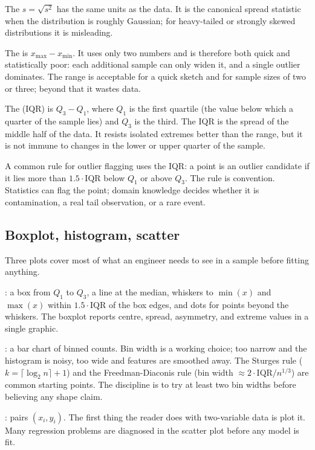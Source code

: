 The  $s = \sqrt{s^{2}}$ has the
same units as the data. It is the canonical spread statistic when the
distribution is roughly Gaussian; for heavy-tailed or strongly
skewed distributions it is misleading.

The  is $x_{\max} - x_{\min}$. It uses only two
numbers and is therefore both quick and statistically poor: each
additional sample can only widen it, and a single outlier dominates.
The range is acceptable for a quick sketch and for sample sizes of
two or three; beyond that it wastes data.

The  (IQR) is $Q_{3} - Q_{1}$, where
$Q_{1}$ is the first quartile (the value below which a quarter of
the sample lies) and $Q_{3}$ is the third. The IQR is the spread of
the middle half of the data. It resists isolated extremes better
than the range, but it is not immune to changes in the lower or
upper quarter of the sample.

A common rule for outlier flagging uses the IQR: a point is an
outlier candidate if it lies more than $1.5 \cdot \text{IQR}$ below
$Q_{1}$ or above $Q_{3}$. The rule is convention. Statistics can
flag the point; domain knowledge decides whether it is
contamination, a real tail observation, or a rare event.

\subsection{Boxplot, histogram, scatter}

Three plots cover most of what an engineer needs to see in a sample
before fitting anything.

: a box from $Q_{1}$ to $Q_{3}$, a line at the
median, whiskers to $\min(x)$ and $\max(x)$ within $1.5 \cdot
\text{IQR}$ of the box edges, and dots for points beyond the
whiskers. The boxplot reports centre, spread, asymmetry, and
extreme values in a single graphic.

: a bar chart of binned counts. Bin width is a
working choice; too narrow and the histogram is noisy, too wide and
features are smoothed away. The Sturges rule ($k = \lceil \log_{2} n
\rceil + 1$) and the Freedman-Diaconis rule (bin width $\approx 2
\cdot \text{IQR} / n^{1/3}$) are common starting points. The
discipline is to try at least two bin widths before believing any
shape claim.

: pairs $(x_{i}, y_{i})$. The first thing the
reader does with two-variable data is plot it. Many regression
problems are diagnosed in the scatter plot before any model is fit.

